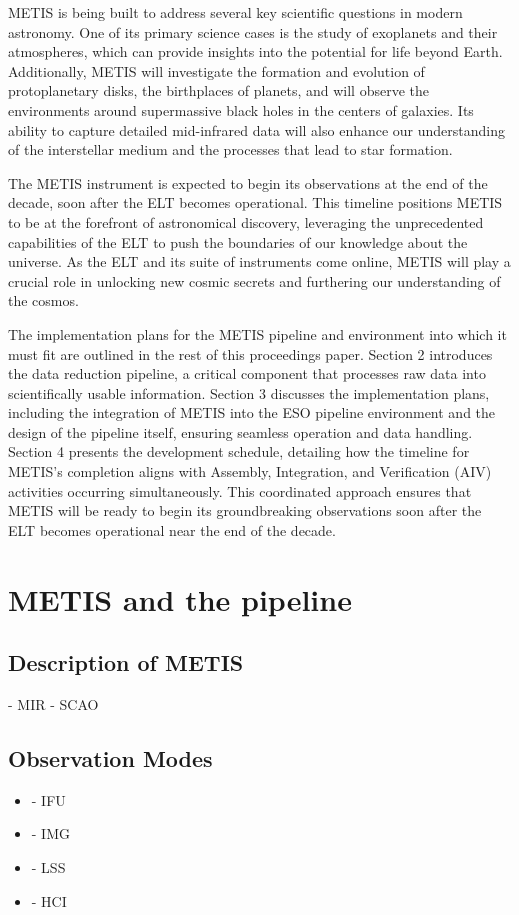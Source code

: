 \documentclass[a4paper]{spie}  %
\begin{document}
METIS is being built to address several key scientific questions in modern astronomy. One of its primary science cases is the study of exoplanets and their atmospheres, which can provide insights into the potential for life beyond Earth. Additionally, METIS will investigate the formation and evolution of protoplanetary disks, the birthplaces of planets, and will observe the environments around supermassive black holes in the centers of galaxies. Its ability to capture detailed mid-infrared data will also enhance our understanding of the interstellar medium and the processes that lead to star formation.

The METIS instrument is expected to begin its observations at the end of the decade, soon after the ELT becomes operational. This timeline positions METIS to be at the forefront of astronomical discovery, leveraging the unprecedented capabilities of the ELT to push the boundaries of our knowledge about the universe. As the ELT and its suite of instruments come online, METIS will play a crucial role in unlocking new cosmic secrets and furthering our understanding of the cosmos.

The implementation plans for the METIS pipeline and environment into which it must fit are outlined in the rest of this proceedings paper. Section 2 introduces the data reduction pipeline, a critical component that processes raw data into scientifically usable information. Section 3 discusses the implementation plans, including the integration of METIS into the ESO pipeline environment and the design of the pipeline itself, ensuring seamless operation and data handling. Section 4 presents the development schedule, detailing how the timeline for METIS's completion aligns with Assembly, Integration, and Verification (AIV) activities occurring simultaneously. This coordinated approach ensures that METIS will be ready to begin its groundbreaking observations soon after the ELT becomes operational near the end of the decade. 



\section{METIS and the pipeline}
\label{sec:environment}

\subsection{Description of METIS}
\label{ssec:env_metis}
	- MIR
	- SCAO
\subsection{Observation Modes}
\label{ssec:env_modes}
 \begin{itemize}
     \item - IFU
     \item - IMG
     \item - LSS
     \item - HCI
 \end{itemize}
 
\end{document}
